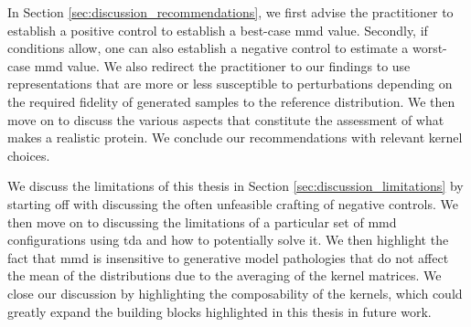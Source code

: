 In Section \ref{sec:discussion_recommendations}, we first advise the
practitioner to establish a positive control to establish a best-case \acrshort{mmd} value.
Secondly, if conditions allow, one can also establish a negative control to
estimate a worst-case \acrshort{mmd} value. We also redirect the practitioner to our
findings to use representations that are more or less susceptible to
perturbations depending on the required fidelity of generated samples to the
reference distribution. We then move on to discuss the various aspects that
constitute the assessment of what makes a realistic protein. We conclude our
recommendations with relevant kernel choices.

We discuss the limitations of this thesis in Section
\ref{sec:discussion_limitations} by starting off with discussing the often
unfeasible crafting of negative controls. We then move on to discussing the
limitations of a particular set of \acrshort{mmd} configurations using \acrshort{tda} and how to
potentially solve it. We then highlight the fact that \acrshort{mmd} is insensitive to
generative model pathologies that do not affect the mean of the distributions
due to the averaging of the kernel matrices. We close our discussion by
highlighting the composability of the kernels, which could greatly expand the
building blocks highlighted in this thesis in future work.
